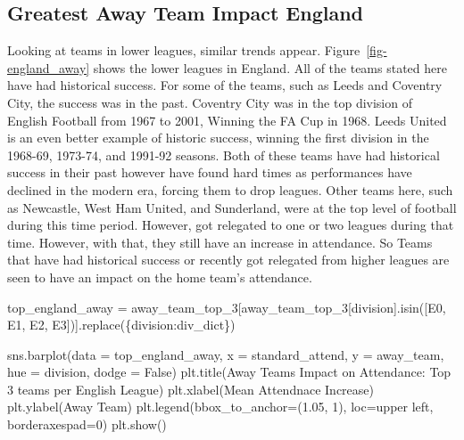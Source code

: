 \documentclass[
  letterpaper,
  DIV=11,
  numbers=noendperiod]{scrartcl}
\newenvironment{Shaded}{\begin{snugshade}}{\end{snugshade}}
\newcommand{\DecValTok}[1]{\textcolor[rgb]{0.68,0.00,0.00}{#1}}
\newcommand{\FloatTok}[1]{\textcolor[rgb]{0.68,0.00,0.00}{#1}}
\newcommand{\NormalTok}[1]{\textcolor[rgb]{0.00,0.23,0.31}{#1}}
\newcommand{\OperatorTok}[1]{\textcolor[rgb]{0.37,0.37,0.37}{#1}}
\newcommand{\StringTok}[1]{\textcolor[rgb]{0.13,0.47,0.30}{#1}}
\newcommand{\VariableTok}[1]{\textcolor[rgb]{0.07,0.07,0.07}{#1}}
\begin{document}
\hypertarget{greatest-away-team-impact-england}{%
\subsection{Greatest Away Team Impact
England}\label{greatest-away-team-impact-england}}

Looking at teams in lower leagues, similar trends appear.
Figure~\ref{fig-england_away} shows the lower leagues in England. All of
the teams stated here have had historical success. For some of the
teams, such as Leeds and Coventry City, the success was in the past.
Coventry City was in the top division of English Football from 1967 to
2001, Winning the FA Cup in 1968. Leeds United is an even better example
of historic success, winning the first division in the 1968-69, 1973-74,
and 1991-92 seasons. Both of these teams have had historical success in
their past however have found hard times as performances have declined
in the modern era, forcing them to drop leagues. Other teams here, such
as Newcastle, West Ham United, and Sunderland, were at the top level of
football during this time period. However, got relegated to one or two
leagues during that time. However, with that, they still have an
increase in attendance. So Teams that have had historical success or
recently got relegated from higher leagues are seen to have an impact on
the home team's attendance.

\begin{Shaded}
\begin{Highlighting}[]
\NormalTok{top\_england\_away }\OperatorTok{=}\NormalTok{ away\_team\_top\_3[away\_team\_top\_3[}\StringTok{\textquotesingle{}division\textquotesingle{}}\NormalTok{].isin([}\StringTok{\textquotesingle{}E0\textquotesingle{}}\NormalTok{, }\StringTok{\textquotesingle{}E1\textquotesingle{}}\NormalTok{, }\StringTok{\textquotesingle{}E2\textquotesingle{}}\NormalTok{, }\StringTok{\textquotesingle{}E3\textquotesingle{}}\NormalTok{])].replace(\{}\StringTok{\textquotesingle{}division\textquotesingle{}}\NormalTok{:div\_dict\})}

\NormalTok{sns.barplot(data }\OperatorTok{=}\NormalTok{ top\_england\_away, x }\OperatorTok{=} \StringTok{\textquotesingle{}standard\_attend\textquotesingle{}}\NormalTok{, y }\OperatorTok{=} \StringTok{\textquotesingle{}away\_team\textquotesingle{}}\NormalTok{, hue }\OperatorTok{=} \StringTok{\textquotesingle{}division\textquotesingle{}}\NormalTok{, dodge }\OperatorTok{=} \VariableTok{False}\NormalTok{)}
\NormalTok{plt.title(}\StringTok{\textquotesingle{}Away Teams Impact on Attendance: Top 3 teams per English League\textquotesingle{}}\NormalTok{)}
\NormalTok{plt.xlabel(}\StringTok{\textquotesingle{}Mean Attendnace Increase\textquotesingle{}}\NormalTok{)}
\NormalTok{plt.ylabel(}\StringTok{\textquotesingle{}Away Team\textquotesingle{}}\NormalTok{)}
\NormalTok{plt.legend(bbox\_to\_anchor}\OperatorTok{=}\NormalTok{(}\FloatTok{1.05}\NormalTok{, }\DecValTok{1}\NormalTok{), loc}\OperatorTok{=}\StringTok{\textquotesingle{}upper left\textquotesingle{}}\NormalTok{, borderaxespad}\OperatorTok{=}\DecValTok{0}\NormalTok{)}
\NormalTok{plt.show()}
\end{Highlighting}
\end{Shaded}
\end{document}
